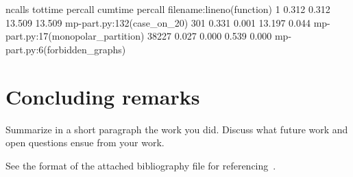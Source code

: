 \documentclass[11pt]{article}
\begin{document}
                              ncalls  tottime  percall  cumtime  percall filename:lineno(function)
                                   1    0.312    0.312   13.509   13.509 mp-part.py:132(case_on_20)
                                 301    0.331    0.001   13.197    0.044 mp-part.py:17(monopolar_partition)
                               38227    0.027    0.000    0.539    0.000 mp-part.py:6(forbidden_graphs)

\section{Concluding remarks}
\label{sec:conclusion}
Summarize in a short paragraph the work you did. Discuss what future work and open questions ensue from your work.



See the format of the attached bibliography file for referencing~\cite{ref1}.
\end{document}
